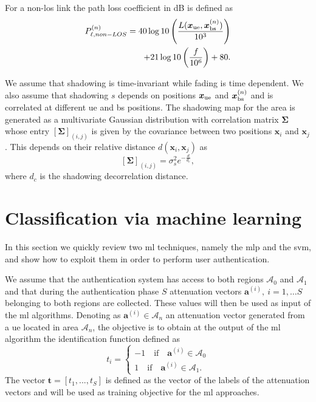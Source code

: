 \documentclass[twocolumns]{IEEEtran}
\begin{document}
For a  non-\ac{los} link the path loss coefficient in dB is defined as
\begin{equation}
\begin{split}
    P_{\ell, non-LOS}^{(n)} = 40\log10\left (\frac{L(\bm{x}_{\rm ue},\bm{x}_{\rm bs}^{(n)})}{10^3}\right ) \\
    + 21\log10\left(\frac{f}{10^6}\right) + 80.
    \end{split}
\end{equation}

We assume that shadowing is time-invariant while fading is time dependent. We also assume that shadowing $s$ depends on positions $\bm{x}_{\rm ue}$ and $\bm{x}_{\rm bs}^{(n)}$ and is correlated at different \ac{ue} and \ac{bs} positions. The shadowing map for the area is generated as a multivariate Gaussian distribution with correlation matrix $\bm{\Sigma}$ whose entry $\left[\bm{\Sigma}\right]_{(i,j)}$ is given by the covariance between two positions $\bm{x}_i$ and $\bm{x}_j$. This depends on their relative distance $d(\bm{x}_i,\bm{x}_j)$ as
\begin{equation}\label{eq: coor mat}
    \left[\bm{\Sigma}\right]_{(i,j)} = \sigma_s^2e^{-\frac{d}{d_c}},
\end{equation}
where $d_c$ is the shadowing decorrelation distance. 

\section{Classification via machine learning}
In this section we quickly review two \ac{ml} techniques, namely the \ac{mlp} and the \ac{svm}, and show how to exploit them in order to perform user authentication.

We assume that the authentication system has access to both regions $\mathcal{A}_0$ and $\mathcal{A}_1$ and that during the authentication phase $S$ attenuation vectors $\bm{a}^{(i)}, \ i=1,\dots S$  belonging to both regions are collected. These values will then be used as input of the \ac{ml} algorithms. Denoting as $\bm{a}^{(i)}\in \mathcal{A}_n$ an attenuation vector generated from a \ac{ue} located in area $\mathcal{A}_{n}$, the objective is to obtain at the output of the \ac{ml} algorithm the identification function defined as
\begin{equation}
  t_i =
  \begin{cases}
  -1 \quad \text{if} \quad \bm{a}^{(i)} \in \mathcal{A}_0\\
  1 \quad \text{if} \quad \bm{a}^{(i)} \in \mathcal{A}_1.
  \end{cases}
\end{equation}
The vector $\bm{t}=[t_1,...,t_S]$ is defined as the vector of the labels of the attenuation vectors and will be used as training objective for the \ac{ml} approaches.
\end{document}
